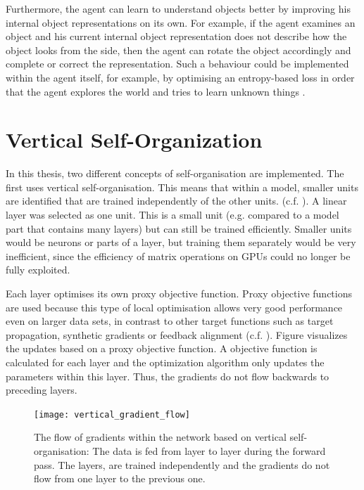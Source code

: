 Furthermore, the agent can learn to understand objects better by improving his internal object representations on its own. For example, if the agent examines an object and his current internal object representation does not describe how the object looks from the side, then the agent can rotate the object accordingly and complete or correct the representation. 
Such a behaviour could be implemented within the agent itself, for example, by optimising an entropy-based loss in order that the agent explores the world and tries to learn unknown things .



\section{Vertical Self-Organization}
In this thesis, two different concepts of self-organisation are implemented.
The first uses vertical self-organisation.
This means that within a model, smaller units are identified that are trained independently of the other units. (c.f. ).
A linear layer was selected as one unit. This is a small unit (e.g. compared to a model part that contains many layers) but can still be trained efficiently.
Smaller units would be neurons or parts of a layer, but training them separately would be very inefficient, since the efficiency of matrix operations on GPUs could no longer be fully exploited.

Each layer optimises its own proxy objective function.
Proxy objective functions are used because this type of local optimisation allows very good performance even on larger data sets, in contrast to other target functions such as target propagation, synthetic gradients or feedback alignment (c.f. ). 
Figure  visualizes the updates based on a proxy objective function.
A objective function is calculated for each layer and the optimization algorithm only updates the parameters within this layer.
Thus, the gradients do not flow backwards to preceding layers.

\begin{figure}[h]
    \centering
    \texttt{[image: vertical\_gradient\_flow]}
    \caption[The flow of gradients within the network based on vertical self-organisation]{The flow of gradients within the network based on vertical self-organisation: The data is fed from layer to layer during the forward pass. The layers, are trained independently and the gradients do not flow from one layer to the previous one.}
\end{figure}

